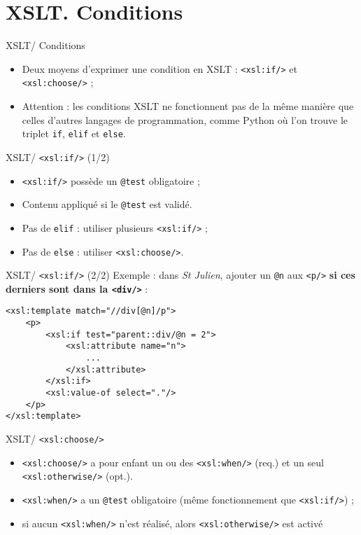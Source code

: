\documentclass{beamer}
\begin{document}
    \section{XSLT. Conditions}

    \begin{frame}{XSLT/ Conditions}
        \Large
        \begin{itemize}
            \item Deux moyens d'exprimer une condition en XSLT : \texttt{<xsl:if/>} et \texttt{<xsl:choose/>} ;
            \bigskip
            \item Attention : les conditions XSLT ne fonctionnent pas de la même manière que celles d'autres langages de programmation, comme Python où l'on trouve le triplet \texttt{if}, \texttt{elif} et \texttt{else}.
        \end{itemize}
    \end{frame}

    \begin{frame}{XSLT/ \texttt{<xsl:if/>} (1/2)}
        \Large
        \begin{itemize}
            \item \texttt{<xsl:if/>} possède un \texttt{@test} obligatoire ;
            \item Contenu appliqué si le \texttt{@test} est validé.
            \bigskip
            \item Pas de \texttt{elif} : utiliser plusieurs \texttt{<xsl:if/>} ;
            \item Pas de \texttt{else} : utiliser \texttt{<xsl:choose/>}.
        \end{itemize}
    \end{frame}

    \begin{frame}[fragile]{XSLT/ \texttt{<xsl:if/>} (2/2)}
        \Large
        Exemple : dans \textit{St Julien}, ajouter un \texttt{@n} aux \texttt{<p/>} \textbf{si ces derniers sont dans la \texttt{<div/>} } :
        \normalsize
        \begin{verbatim}
<xsl:template match="//div[@n]/p">
    <p>
        <xsl:if test="parent::div/@n = 2">
            <xsl:attribute name="n">
                ...
            </xsl:attribute>
        </xsl:if>
        <xsl:value-of select="."/>
    </p>
</xsl:template>
        \end{verbatim}
    \end{frame}

    \begin{frame}{XSLT/ \texttt{<xsl:choose/>}}
        \Large
        \begin{itemize}
            \item \texttt{<xsl:choose/>} a pour enfant un ou des \texttt{<xsl:when/>} (req.) et un seul \texttt{<xsl:otherwise/>} (opt.).
            \bigskip
            \item \texttt{<xsl:when/>} a un \texttt{@test} obligatoire (même fonctionnement que \texttt{<xsl:if/>}) ;
            \bigskip
            \item si aucun \texttt{<xsl:when/>} n'est réalisé, alors \texttt{<xsl:otherwise/>} est activé
        \end{itemize}
    \end{frame}
\end{document}
